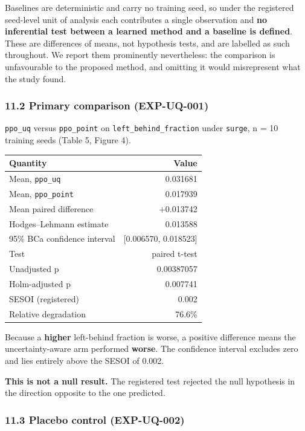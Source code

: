 \documentclass[
]{article}
\begin{document}
Baselines are deterministic and carry no training seed, so under the
registered seed-level unit of analysis each contributes a single
observation and \textbf{no inferential test between a learned method and
a baseline is defined}. These are differences of means, not hypothesis
tests, and are labelled as such throughout. We report them prominently
nevertheless: the comparison is unfavourable to the proposed method, and
omitting it would misrepresent what the study found.

\subsubsection{11.2 Primary comparison
(EXP-UQ-001)}\label{112-primary-comparison-exp-uq-001}

\texttt{ppo\_uq} versus \texttt{ppo\_point} on
\texttt{left\_behind\_fraction} under \texttt{surge}, n = 10 training
seeds (Table 5, Figure 4).

\begin{longtable}[]{@{}lr@{}}
\toprule\noalign{}
Quantity & Value \\
\midrule\noalign{}
\endhead
\bottomrule\noalign{}
\endlastfoot
Mean, \texttt{ppo\_uq} & 0.031681 \\
Mean, \texttt{ppo\_point} & 0.017939 \\
Mean paired difference & +0.013742 \\
Hodges--Lehmann estimate & 0.013588 \\
95\% BCa confidence interval & {[}0.006570, 0.018523{]} \\
Test & paired t-test \\
Unadjusted p & 0.00387057 \\
Holm-adjusted p & 0.007741 \\
SESOI (registered) & 0.002 \\
Relative degradation & 76.6\% \\
\end{longtable}

Because a \textbf{higher} left-behind fraction is worse, a positive
difference means the uncertainty-aware arm performed \textbf{worse}. The
confidence interval excludes zero and lies entirely above the SESOI of
0.002.

\textbf{This is not a null result.} The registered test rejected the
null hypothesis in the direction opposite to the one predicted.

\subsubsection{11.3 Placebo control
(EXP-UQ-002)}\label{113-placebo-control-exp-uq-002}
\end{document}
